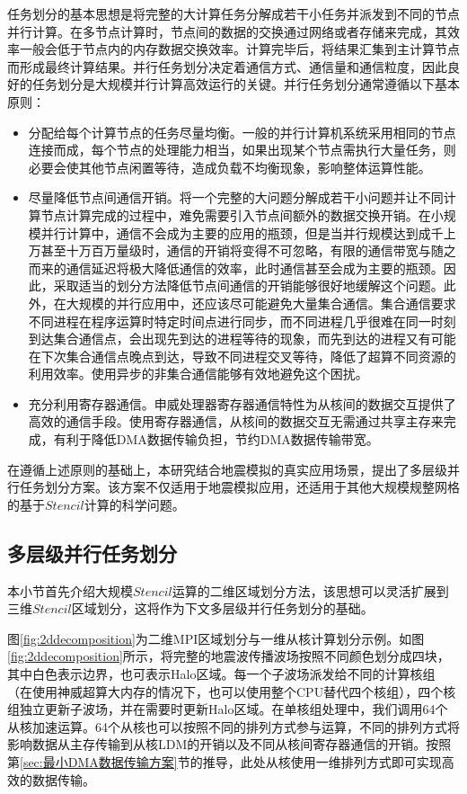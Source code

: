 任务划分的基本思想是将完整的大计算任务分解成若干小任务并派发到不同的节点并行计算。在多节点计算时，节点间的数据的交换通过网络或者存储来完成，其效率一般会低于节点内的内存数据交换效率。计算完毕后，将结果汇集到主计算节点而形成最终计算结果。并行任务划分决定着通信方式、通信量和通信粒度，因此良好的任务划分是大规模并行计算高效运行的关键。并行任务划分通常遵循以下基本原则：
\begin{itemize}
  \item 分配给每个计算节点的任务尽量均衡。一般的并行计算机系统采用相同的节点连接而成，每个节点的处理能力相当，如果出现某个节点需执行大量任务，则必要会使其他节点闲置等待，造成负载不均衡现象，影响整体运算性能。
  \item 尽量降低节点间通信开销。将一个完整的大问题分解成若干小问题并让不同计算节点计算完成的过程中，难免需要引入节点间额外的数据交换开销。在小规模并行计算中，通信不会成为主要的应用的瓶颈，但是当并行规模达到成千上万甚至十万百万量级时，通信的开销将变得不可忽略，有限的通信带宽与随之而来的通信延迟将极大降低通信的效率，此时通信甚至会成为主要的瓶颈。因此，采取适当的划分方法降低节点间通信的开销能够很好地缓解这个问题。此外，在大规模的并行应用中，还应该尽可能避免大量集合通信。集合通信要求不同进程在程序运算时特定时间点进行同步，而不同进程几乎很难在同一时刻到达集合通信点，会出现先到达的进程等待的现象，而先到达的进程又有可能在下次集合通信点晚点到达，导致不同进程交叉等待，降低了超算不同资源的利用效率。使用异步的非集合通信能够有效地避免这个困扰。
  \item 充分利用寄存器通信。申威处理器寄存器通信特性为从核间的数据交互提供了高效的通信手段。使用寄存器通信，从核间的数据交互无需通过共享主存来完成，有利于降低DMA数据传输负担，节约DMA数据传输带宽。
\end{itemize}

在遵循上述原则的基础上，本研究结合地震模拟的真实应用场景，提出了多层级并行任务划分方案。该方案不仅适用于地震模拟应用，还适用于其他大规模规整网格的基于$Stencil$计算的科学问题。

\subsection{多层级并行任务划分}

本小节首先介绍大规模$Stencil$运算的二维区域划分方法，该思想可以灵活扩展到三维$Stencil$区域划分，这将作为下文多层级并行任务划分的基础。

图\ref{fig:2ddecomposition}为二维MPI区域划分与一维从核计算划分示例。如图\ref{fig:2ddecomposition}所示，将完整的地震波传播波场按照不同颜色划分成四块，其中白色表示边界，也可表示Halo区域。每一个子波场派发给不同的计算核组（在使用神威超算大内存的情况下，也可以使用整个CPU替代四个核组），四个核组独立更新子波场，并在需要时更新Halo区域。在单核组处理中，我们调用64个从核加速运算。64个从核也可以按照不同的排列方式参与运算，不同的排列方式将影响数据从主存传输到从核LDM的开销以及不同从核间寄存器通信的开销。按照第\ref{sec:最小DMA数据传输方案}节的推导，此处从核使用一维排列方式即可实现高效的数据传输。


